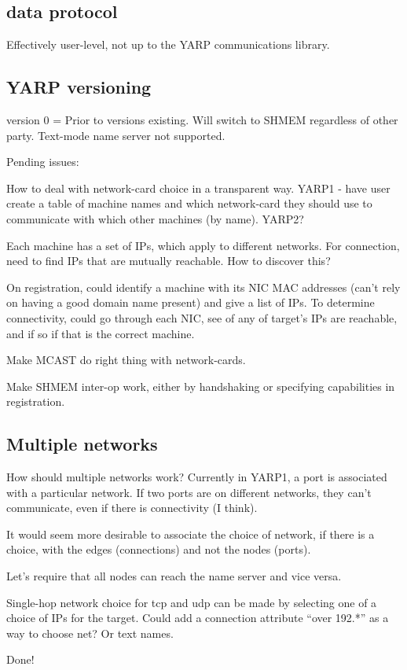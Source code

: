 \subsection{data protocol}

Effectively user-level, not up to the YARP communications library.


\subsection{YARP versioning}


version 0 = Prior to versions existing.
Will switch to SHMEM regardless of other party.
Text-mode name server not supported.

Pending issues: 

How to deal with network-card choice in a transparent
way.  YARP1 - have user create a table of machine names and which
network-card they should use to communicate with which other machines
(by name).  YARP2?  

Each machine has a set of IPs, which apply to different networks.
For connection, need to find IPs that are mutually reachable.
How to discover this?

On registration, could identify a machine with its NIC 
MAC addresses (can't rely on having a good domain name present)
and give a list of IPs.  To determine connectivity, could go
through each NIC, see of any of target's IPs are reachable,
and if so if that is the correct machine.


Make MCAST do right thing with network-cards.

Make SHMEM inter-op work, either by handshaking or specifying 
capabilities in registration.


\subsection{Multiple networks}

How should multiple networks work?  Currently in YARP1, a port is
associated with a particular network.  If two ports are on different
networks, they can't communicate, even if there is connectivity
(I think).

It would seem more desirable to associate the choice of network,
if there is a choice, with the edges (connections) and not the
nodes (ports).

Let's require that all nodes can reach the name server and vice
versa.

Single-hop network choice for tcp and udp can be made by selecting one
of a choice of IPs for the target.  Could add a connection attribute
``over 192.*'' as a way to choose net?  Or text names.

Done!

